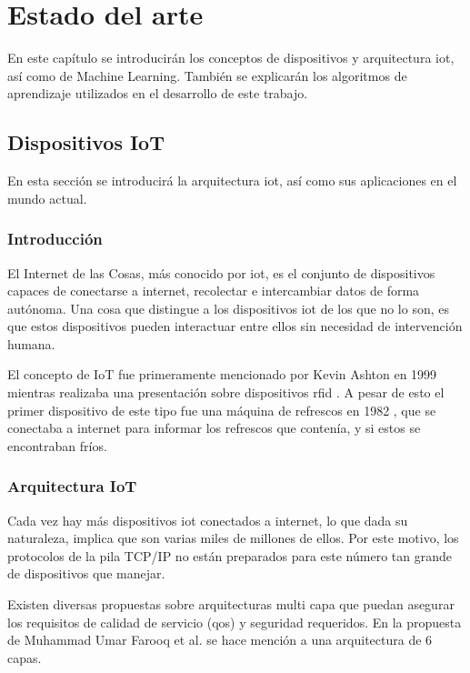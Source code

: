 
\chapter{Estado del arte} \label{chap:art}

En este capítulo se introducirán los conceptos de dispositivos y arquitectura \acrshort{iot}, así como de Machine Learning. También se explicarán los algoritmos de aprendizaje utilizados en el desarrollo de este trabajo.

\section{Dispositivos IoT}

En esta sección se introducirá la arquitectura \acrshort{iot}, así como sus aplicaciones en el mundo actual.

\subsection{Introducción}

El Internet de las Cosas, más conocido por \acrfull{iot}, es el conjunto de  dispositivos capaces de conectarse a internet, recolectar e intercambiar datos de forma autónoma. Una cosa que distingue a los dispositivos \acrshort{iot} de los que no lo son, es que estos dispositivos pueden interactuar entre ellos sin necesidad de intervención humana.

El concepto de IoT fue primeramente mencionado por Kevin Ashton en 1999 mientras realizaba una presentación sobre dispositivos \acrfull{rfid} \cite{gokhale2018introduction}. A pesar de esto el primer dispositivo de este tipo fue una máquina de refrescos en 1982 \cite{cokemachine1982iot}, que se conectaba a internet para informar los refrescos que contenía, y si estos se encontraban fríos.

\subsection{Arquitectura IoT}

Cada vez hay más dispositivos \acrshort{iot} conectados a internet, lo que dada su naturaleza, implica que son varias miles de millones de ellos. Por este motivo, los protocolos de la pila TCP/IP no están preparados para este número tan grande de dispositivos que manejar.

Existen diversas propuestas sobre arquitecturas multi capa que puedan asegurar los requisitos de calidad de servicio (\acrshort{qos}) y seguridad requeridos. En la propuesta de Muhammad Umar Farooq et al. \cite{farooq2015review} se hace mención a una arquitectura de 6 capas.

